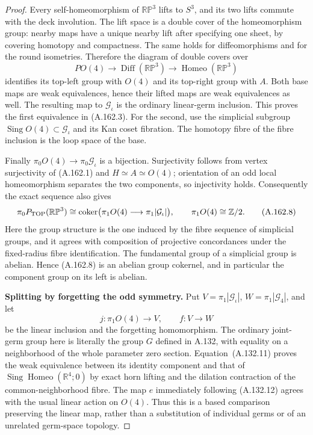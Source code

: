 \begin{proof}
Every self-homeomorphism of $\mathbb {RP}^3$ lifts to $S^3$, and its two
lifts commute with the deck involution. The lift space is a double cover
of the homeomorphism group: nearby maps have a unique nearby lift after
specifying one sheet, by covering homotopy and compactness. The same holds
for diffeomorphisms and for the round isometries. Therefore the diagram
of double covers over
\[
 PO(4)\longrightarrow\operatorname{Diff}(\mathbb {RP}^3)
         \longrightarrow\operatorname{Homeo}(\mathbb {RP}^3)
\]
identifies its top-left group with $O(4)$ and its top-right group with
$A$. Both base maps are weak equivalences, hence their lifted maps are
weak equivalences as well. The resulting map to $\mathcal G_\iota$ is
the ordinary linear-germ inclusion. This proves the first equivalence
in (A.162.3). For the second, use the simplicial subgroup
$\operatorname{Sing}O(4)\subset\mathcal G_\iota$ and its Kan coset fibration.
The homotopy fibre of the fibre inclusion is the loop space of the base.

Finally $\pi_0O(4)\to\pi_0\mathcal G_\iota$ is a bijection. Surjectivity
follows from vertex surjectivity of (A.162.1) and $H\simeq A\simeq O(4)$;
orientation of an odd local homeomorphism separates the two components,
so injectivity holds. Consequently the exact sequence also gives
\[
 \pi_0P_{\rm TOP}(\mathbb {RP}^3)
 \cong
 \operatorname{coker}\bigl(\pi_1O(4)\longrightarrow
                              \pi_1|\mathcal G_\iota|\bigr),
 \qquad \pi_1O(4)\cong\mathbb Z/2.
 \tag{A.162.8}
\]
Here the group structure is the one induced by the fibre sequence of
simplicial groups, and it agrees with composition of projective
concordances under the fixed-radius fibre identification. The fundamental
group of a simplicial group is abelian. Hence (A.162.8) is an abelian group
cokernel, and in particular the component group on its left is abelian.

\textbf{Splitting by forgetting the odd symmetry.}\quad
Put $V=\pi_1|\mathcal G_\iota|$, $W=\pi_1|\mathcal G_4|$, and let
\[
 j:\pi_1O(4)\longrightarrow V,\qquad f:V\longrightarrow W
 \tag{A.162.9}
\]
be the linear inclusion and the forgetting homomorphism. The ordinary
joint-germ group here is literally the group $G$ defined in A.132,
with equality on a neighborhood of the whole parameter zero section.
Equation~(A.132.11) proves the weak equivalence between its identity
component and that of
$\operatorname{Sing}\operatorname{Homeo}(\mathbb R^4;0)$ by exact horn
lifting and the dilation contraction of the common-neighborhood fibre.
The map $e$ immediately following (A.132.12) agrees with the usual linear
action on $O(4)$. Thus this is a based comparison preserving the linear
map, rather than a substitution of individual germs or of an unrelated
germ-space topology.


\end{proof}
